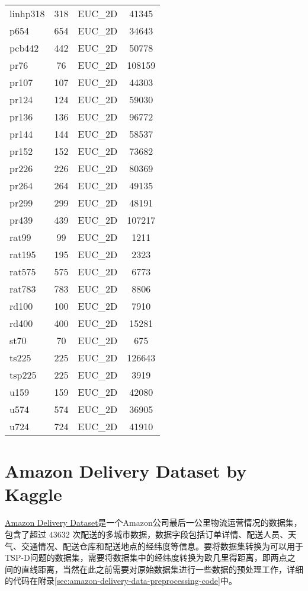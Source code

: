 \begin{tabularx}{\textwidth}{lccc}
    linhp318 & 318 & EUC\_2D & 41345 \\
    p654 & 654 & EUC\_2D & 34643 \\
    pcb442 & 442 & EUC\_2D & 50778 \\
    pr76 & 76 & EUC\_2D & 108159 \\
    pr107 & 107 & EUC\_2D & 44303 \\
    pr124 & 124 & EUC\_2D & 59030 \\
    pr136 & 136 & EUC\_2D & 96772 \\
    pr144 & 144 & EUC\_2D & 58537 \\
    pr152 & 152 & EUC\_2D & 73682 \\
    pr226 & 226 & EUC\_2D & 80369 \\
    pr264 & 264 & EUC\_2D & 49135 \\
    pr299 & 299 & EUC\_2D & 48191 \\
    pr439 & 439 & EUC\_2D & 107217 \\
    rat99 & 99 & EUC\_2D & 1211 \\
    rat195 & 195 & EUC\_2D & 2323 \\
    rat575 & 575 & EUC\_2D & 6773 \\
    rat783 & 783 & EUC\_2D & 8806 \\
    rd100 & 100 & EUC\_2D & 7910 \\
    rd400 & 400 & EUC\_2D & 15281 \\
    st70 & 70 & EUC\_2D & 675 \\
    ts225 & 225 & EUC\_2D & 126643 \\
    tsp225 & 225 & EUC\_2D & 3919 \\
    u159 & 159 & EUC\_2D & 42080 \\
    u574 & 574 & EUC\_2D & 36905 \\
    u724 & 724 & EUC\_2D & 41910 \\
\end{tabularx}

\section{Amazon Delivery Dataset by Kaggle}
\href{https://www.kaggle.com/datasets/sujalsuthar/amazon-delivery-dataset}{Amazon Delivery Dataset}是一个Amazon公司最后一公里物流运营情况的数据集，包含了超过 $43632$ 次配送的多城市数据，数据字段包括订单详情、配送人员、天气、交通情况、配送仓库和配送地点的经纬度等信息。要将数据集转换为可以用于TSP-D问题的数据集，需要将数据集中的经纬度转换为欧几里得距离，即两点之间的直线距离，当然在此之前需要对原始数据集进行一些数据的预处理工作，详细的代码在附录\ref{sec:amazon-delivery-data-preprocessing-code}中。

